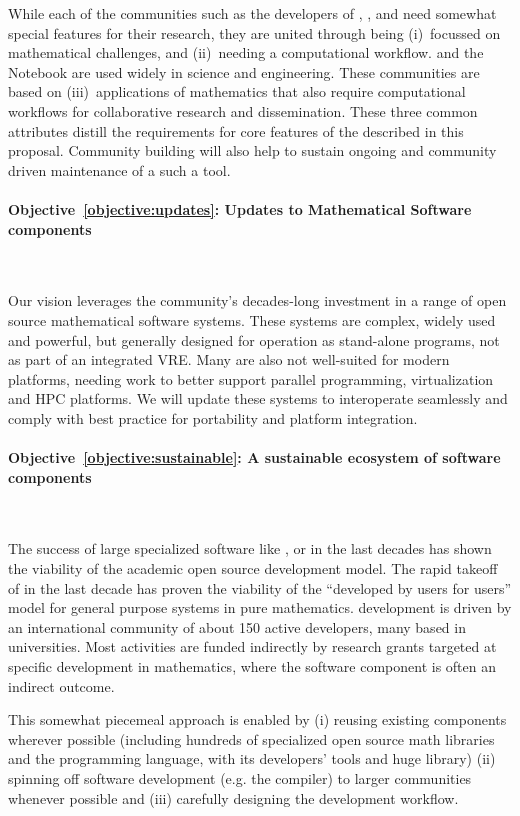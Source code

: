 \documentclass[noworkareas,deliverables,\classoptions]{euproposal}       %
\begin{document}
\begin{proposal}
While each of the communities such as the developers of \Sage,
\Singular, and \GAP need somewhat special features for their research,
they are united through being (i)~focussed on mathematical challenges,
and (ii)~needing a computational workflow. \IPython and the \Jupyter
Notebook are used widely in science and engineering. These communities
are based on (iii)~applications of mathematics that also require
computational workflows for collaborative research and
dissemination. These three common attributes distill the requirements
for core features of the \VREs described in this proposal. Community
building will also help to sustain ongoing and community driven
maintenance of a such a tool.


\paragraph{Objective~\ref{objective:updates}: Updates to Mathematical
  Software components}\

Our vision leverages the community's decades-long investment in a
range of open source mathematical software systems. These systems are
complex, widely used and powerful, but generally designed for
operation as stand-alone programs, not as part of an integrated
VRE. Many are also not well-suited for modern platforms, needing work
to better support parallel programming, virtualization and HPC
platforms. We will update these systems to interoperate seamlessly and
comply with best practice for portability and platform integration.


\paragraph{Objective~\ref{objective:sustainable}: A sustainable
  ecosystem of software components}\ 

The success of large specialized software like \PariGP, \Singular or
\GAP in the last decades has shown the viability of the academic open
source development model. The rapid takeoff of \Sage in the last
decade has proven the viability of the ``developed by users for
users'' model for general purpose systems in pure mathematics.  \Sage
development is driven by an international community of about 150
active developers, many based in universities.  Most activities are
funded indirectly by research grants targeted at specific development
in mathematics, where the software component is often an indirect
outcome.

This somewhat piecemeal approach is enabled by (i) reusing existing
components wherever possible (including hundreds of specialized open
source math libraries and the \Python programming language, with its
developers' tools and huge library) (ii) spinning off software
development (e.g. the \Cython compiler) to larger communities whenever
possible and (iii) carefully designing the development workflow.


\end{proposal}
\end{document}
